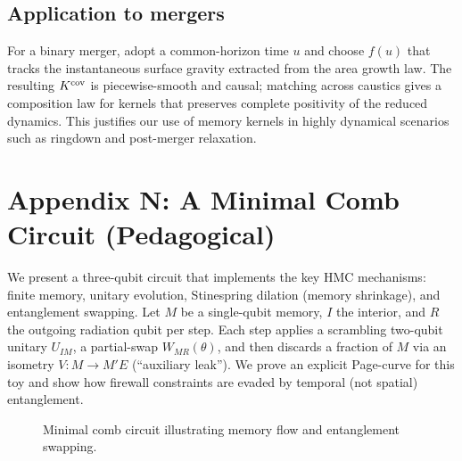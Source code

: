 \documentclass[aps,prd,preprint,onecolumn,superscriptaddress,nofootinbib,longbibliography,floatfix,11pt,showpacs,showkeys]{revtex4-2}
\theoremstyle{plain}
\theoremstyle{definition}
\theoremstyle{remark}
\begin{document}
\subsection*{Application to mergers}
For a binary merger, adopt a common-horizon time $u$ and choose $f(u)$ that tracks the instantaneous surface gravity extracted from the area growth law. The resulting $K^{\rm cov}$ is piecewise-smooth and causal; matching across caustics gives a composition law for kernels that preserves complete positivity of the reduced dynamics. This justifies our use of memory kernels in highly dynamical scenarios such as ringdown and post-merger relaxation.

\section{Appendix N: A Minimal Comb Circuit (Pedagogical)}
\label{app:minicomb}
We present a three-qubit circuit that implements the key HMC mechanisms: finite memory, unitary evolution, Stinespring dilation (memory shrinkage), and entanglement swapping.
Let $M$ be a single-qubit memory, $I$ the interior, and $R$ the outgoing radiation qubit per step.
Each step applies a scrambling two-qubit unitary $U_{IM}$, a partial-swap $W_{MR}(\theta)$, and then discards a fraction of $M$ via an isometry $V:M\!\to\!M'\!E$ (``auxiliary leak'').
We prove an explicit Page-curve for this toy and show how firewall constraints are evaded by temporal (not spatial) entanglement.
\begin{figure}[ht]
\centering
{}
\caption{Minimal comb circuit illustrating memory flow and entanglement swapping.}
\label{fig:minicomb_circuit}
\end{figure}
\end{document}
